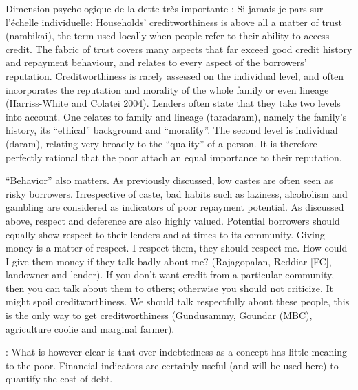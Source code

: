 \documentclass[a4paper, 11pt, onecolumn]{article}
\begin{document}
Dimension psychologique de la dette très importante :
\cite{Guerin2014a} Si jamais je pars sur l'échelle individuelle: Households’ creditworthiness is above all a matter of trust (nambikai), the term used locally
when people refer to their ability to access credit. The fabric of trust covers many aspects that
far exceed good credit history and repayment behaviour, and relates to every aspect of the
borrowers’ reputation. Creditworthiness is rarely assessed on the individual level, and often
incorporates the reputation and morality of the whole family or even lineage (Harriss-White
and Colatei 2004). Lenders often state that they take two levels into account. One relates to
family and lineage (taradaram), namely the family’s history, its “ethical” background and
“morality”. The second level is individual (daram), relating very broadly to the “quality” of a
person. It is therefore perfectly rational that the poor attach an equal importance to their
reputation.

“Behavior” also matters. As previously discussed, low castes are often seen as risky
borrowers. Irrespective of caste, bad habits such as laziness, alcoholism and gambling are
considered as indicators of poor repayment potential. As discussed above, respect and deference are also highly valued. Potential borrowers should equally show respect to their
lenders and at times to its community.
Giving money is a matter of respect. I respect them, they should respect me. How could I give them
money if they talk badly about me? (Rajagopalan, Reddiar [FC], landowner and lender).
If you don’t want credit from a particular community, then you can talk about them to others; otherwise
you should not criticize. It might spoil creditworthiness. We should talk respectfully about these people,
this is the only way to get creditworthiness (Gundusammy, Goundar (MBC), agriculture coolie and
marginal farmer).

\cite{Guerin2014a} : What is however clear is that over-indebtedness as a concept has little meaning to the poor.
Financial indicators are certainly useful (and will be used here) to quantify the cost of debt.
\end{document}
